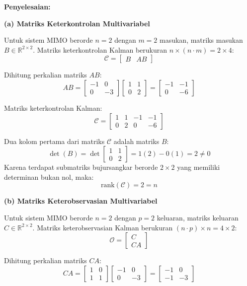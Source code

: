\documentclass[11pt,a4paper]{article}
\begin{document}
\textbf{Penyelesaian:}

\textbf{(a) Matriks Keterkontrolan Multivariabel}

Untuk sistem MIMO berorde $n = 2$ dengan $m = 2$ masukan, matriks masukan $B \in \mathbb{R}^{2 \times 2}$. Matriks keterkontrolan Kalman berukuran $n \times (n \cdot m) = 2 \times 4$:
$$\mathcal{C} = \begin{bmatrix} B & AB \end{bmatrix}$$

Dihitung perkalian matriks $AB$:
$$AB = \begin{bmatrix} -1 & 0 \\ 0 & -3 \end{bmatrix} \begin{bmatrix} 1 & 1 \\ 0 & 2 \end{bmatrix} = \begin{bmatrix} -1 & -1 \\ 0 & -6 \end{bmatrix}$$

Matriks keterkontrolan Kalman:
$$\mathcal{C} = \begin{bmatrix} 1 & 1 & -1 & -1 \\ 0 & 2 & 0 & -6 \end{bmatrix}$$

Dua kolom pertama dari matriks $\mathcal{C}$ adalah matriks $B$:
$$\det(B) = \det\begin{bmatrix} 1 & 1 \\ 0 & 2 \end{bmatrix} = 1(2) - 0(1) = 2 \ne 0$$
Karena terdapat submatriks bujursangkar berorde $2 \times 2$ yang memiliki determinan bukan nol, maka:
$$\text{rank}(\mathcal{C}) = 2 = n$$

\textbf{(b) Matriks Keterobservasian Multivariabel}

Untuk sistem MIMO berorde $n = 2$ dengan $p = 2$ keluaran, matriks keluaran $C \in \mathbb{R}^{2 \times 2}$. Matriks keterobservasian Kalman berukuran $(n \cdot p) \times n = 4 \times 2$:
$$\mathcal{O} = \begin{bmatrix} C \\ CA \end{bmatrix}$$

Dihitung perkalian matriks $CA$:
$$CA = \begin{bmatrix} 1 & 0 \\ 1 & 1 \end{bmatrix} \begin{bmatrix} -1 & 0 \\ 0 & -3 \end{bmatrix} = \begin{bmatrix} -1 & 0 \\ -1 & -3 \end{bmatrix}$$
\end{document}
